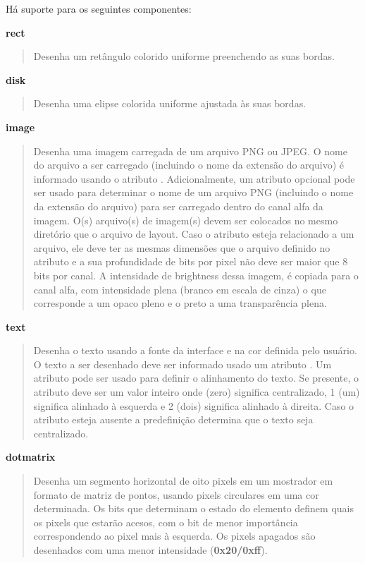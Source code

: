 \documentclass[letterpaper,10pt,brazil]{sphinxmanual}
\begin{document}
Há suporte para os seguintes componentes:

\textbf{rect}
\begin{quote}

Desenha um retângulo colorido uniforme preenchendo as suas bordas.
\end{quote}

\textbf{disk}
\begin{quote}

Desenha uma elipse colorida uniforme ajustada às suas bordas.
\end{quote}

\textbf{image}
\begin{quote}

Desenha uma imagem carregada de um arquivo PNG ou JPEG. O nome do
arquivo a ser carregado (incluindo o nome da extensão do arquivo) é
informado usando o atributo . Adicionalmente, um atributo
opcional  pode ser usado para determinar o nome de um
arquivo PNG (incluindo o nome da extensão do arquivo) para ser
carregado dentro do canal alfa da imagem. O(s) arquivo(s) de
imagem(s) devem ser colocados no mesmo diretório que o arquivo de
layout. Caso o atributo  esteja relacionado a um
arquivo, ele deve ter as mesmas dimensões que o arquivo definido no
atributo  e a sua profundidade de bits por pixel não deve
ser maior que 8 bits por canal. A intensidade de brightness dessa
imagem, é copiada para o canal alfa, com intensidade plena
(branco em escala de cinza) o que corresponde a um opaco
pleno e o preto a uma transparência plena.
\end{quote}

\textbf{text}
\begin{quote}

Desenha o texto usando a fonte da interface e na cor definida pelo
usuário. O texto a ser desenhado deve ser informado usado um
atributo .  Um atributo  pode ser usado para
definir o alinhamento do texto. Se presente, o atributo 
deve ser um valor inteiro onde (zero) significa centralizado, 1 (um)
significa alinhado à esquerda e 2 (dois) significa alinhado à direita.
Caso o atributo  esteja ausente a predefinição determina
que o texto seja centralizado.
\end{quote}

\textbf{dotmatrix}
\begin{quote}

Desenha um segmento horizontal de oito pixels em um mostrador em
formato de matriz de pontos, usando pixels circulares em uma cor
determinada. Os bits que determinam o estado do elemento definem
quais os pixels que estarão acesos, com o bit de menor importância
correspondendo ao pixel mais à esquerda. Os pixels apagados são
desenhados com uma menor intensidade (\textbf{0x20/0xff}).
\end{quote}
\end{document}
